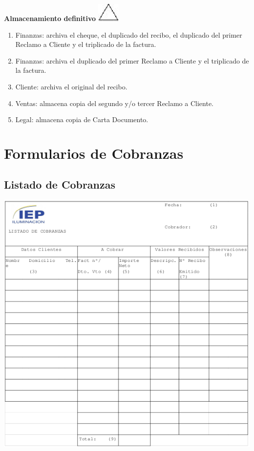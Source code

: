 \begin{center}
  \textbf{Almacenamiento definitivo}
  \includegraphics{./Images/Simbolos/simbolo-Almacenamiento-Definitivo.png}
\end{center}
\begin{enumerate}
\item Finanzas: archiva el cheque, el duplicado del recibo, el duplicado del primer Reclamo a Cliente y el triplicado de la factura.
\item Finanzas: archiva el duplicado del primer Reclamo a Cliente y el triplicado de la factura.
\item Cliente: archiva el original del recibo.
\item Ventas: almacena copia del segundo y/o tercer Reclamo a Cliente.
\item Legal: almacena copia de Carta Documento.
\end{enumerate}

\pagebreak
\section{Formularios de Cobranzas}

\subsection{Listado de Cobranzas}
\begin{center}
  \includegraphics[scale=0.6]{./Images/FormulariosIEP/listado_cobranzas_IEP.png}
\end{center}


